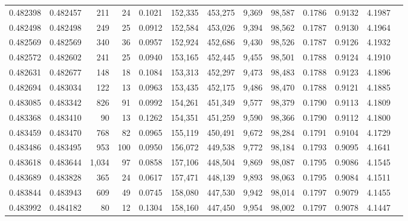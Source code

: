 \begin{tabular}{rrrrrrrrrrrrr}
0.482398 & 0.482457 &   211 &    24 &                                     0.1021 & 152,335 & 453,275 &   9,369 &  98,587 & 0.1786 & 0.9132 & 4.1987 \\
0.482498 & 0.482498 &   249 &    25 &                                     0.0912 & 152,584 & 453,026 &   9,394 &  98,562 & 0.1787 & 0.9130 & 4.1964 \\
0.482569 & 0.482569 &   340 &    36 &                                     0.0957 & 152,924 & 452,686 &   9,430 &  98,526 & 0.1787 & 0.9126 & 4.1932 \\
0.482572 & 0.482602 &   241 &    25 &                                     0.0940 & 153,165 & 452,445 &   9,455 &  98,501 & 0.1788 & 0.9124 & 4.1910 \\
0.482631 & 0.482677 &   148 &    18 &                                     0.1084 & 153,313 & 452,297 &   9,473 &  98,483 & 0.1788 & 0.9123 & 4.1896 \\
0.482694 & 0.483034 &   122 &    13 &                                     0.0963 & 153,435 & 452,175 &   9,486 &  98,470 & 0.1788 & 0.9121 & 4.1885 \\
0.483085 & 0.483342 &   826 &    91 &                                     0.0992 & 154,261 & 451,349 &   9,577 &  98,379 & 0.1790 & 0.9113 & 4.1809 \\
0.483368 & 0.483410 &    90 &    13 &                                     0.1262 & 154,351 & 451,259 &   9,590 &  98,366 & 0.1790 & 0.9112 & 4.1800 \\
0.483459 & 0.483470 &   768 &    82 &                                     0.0965 & 155,119 & 450,491 &   9,672 &  98,284 & 0.1791 & 0.9104 & 4.1729 \\
0.483486 & 0.483495 &   953 &   100 &                                     0.0950 & 156,072 & 449,538 &   9,772 &  98,184 & 0.1793 & 0.9095 & 4.1641 \\
0.483618 & 0.483644 & 1,034 &    97 &                                     0.0858 & 157,106 & 448,504 &   9,869 &  98,087 & 0.1795 & 0.9086 & 4.1545 \\
0.483689 & 0.483828 &   365 &    24 &                                     0.0617 & 157,471 & 448,139 &   9,893 &  98,063 & 0.1795 & 0.9084 & 4.1511 \\
0.483844 & 0.483943 &   609 &    49 &                                     0.0745 & 158,080 & 447,530 &   9,942 &  98,014 & 0.1797 & 0.9079 & 4.1455 \\
0.483992 & 0.484182 &    80 &    12 &                                     0.1304 & 158,160 & 447,450 &   9,954 &  98,002 & 0.1797 & 0.9078 & 4.1447 \\

\end{tabular}
